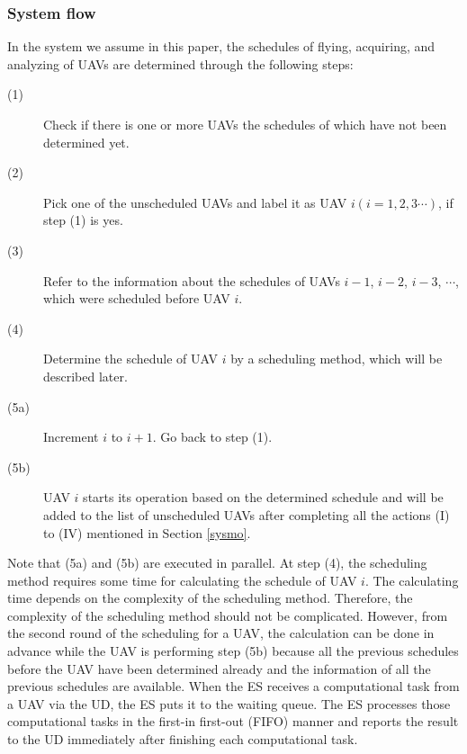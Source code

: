 \documentclass{ieeeaccess}
\begin{document}
\subsubsection{System flow}\label{flow}
In the system we assume in this paper, the schedules of flying, acquiring, and analyzing of UAVs are determined through the following steps:
%
\begin{description}
\item[(1)] Check if there is one or more UAVs the schedules of which have not been determined yet.
\item[(2)] Pick one of the unscheduled UAVs and label it as UAV $i (i=1, 2, 3\cdots)$, if step (1) is yes.
\item[(3)] Refer to the information about the schedules of UAVs $i-1$, $i-2$, $i-3$, $\cdots$, which were scheduled before UAV $i$.
\item[(4)] Determine the schedule of UAV $i$ by a scheduling method, which will be described later.
\item[(5a)] Increment $i$ to $i+1$. Go back to step (1).
\item[(5b)] UAV $i$ starts its operation based on the determined schedule and will be added to the list of unscheduled UAVs after completing all the actions (I) to (I\hspace{-.1em}V) mentioned in Section \ref{sysmo}.
\end{description}
%
Note that (5a) and (5b) are executed in parallel.
%
At step (4), the scheduling method requires some time for calculating the schedule of UAV $i$.
%
The calculating time depends on the complexity of the scheduling method.
%
Therefore, the complexity of the scheduling method should not be complicated.
%
However, from the second round of the scheduling for a UAV, the calculation can be done in advance while the UAV is performing step (5b) because all the previous schedules before the UAV have been determined already and the information of all the previous schedules are available.
%
%
When the ES receives a computational task from a UAV via the UD, the ES puts it to the waiting queue.
%
The ES processes those computational tasks in the first-in first-out (FIFO) manner and reports the result to the UD immediately after finishing each computational task.
\end{document}
